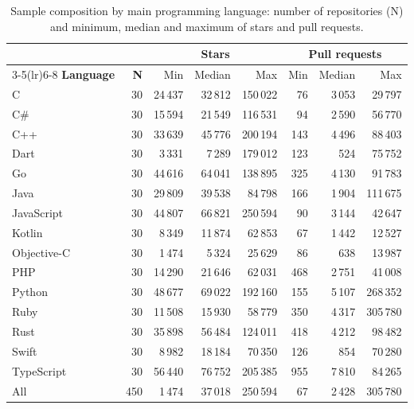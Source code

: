 \begin{table}[t]
\centering
\caption{Sample composition by main programming language: number of repositories (N) and minimum, median and maximum of stars and pull requests.}
\label{tab:sample-by-language}
\small
\begin{tabular}{lrrrrrrr}
\toprule
 & & \multicolumn{3}{c}{\textbf{Stars}} & \multicolumn{3}{c}{\textbf{Pull requests}} \\
\cmidrule(lr){3-5}\cmidrule(lr){6-8}
\textbf{Language} & \textbf{N} & Min & Median & Max & Min & Median & Max \\
\midrule
C & 30 & 24\,437 & 32\,812 & 150\,022 & 76 & 3\,053 & 29\,797 \\
C\# & 30 & 15\,594 & 21\,549 & 116\,531 & 94 & 2\,590 & 56\,770 \\
C++ & 30 & 33\,639 & 45\,776 & 200\,194 & 143 & 4\,496 & 88\,403 \\
Dart & 30 & 3\,331 & 7\,289 & 179\,012 & 123 & 524 & 75\,752 \\
Go & 30 & 44\,616 & 64\,041 & 138\,895 & 325 & 4\,130 & 91\,783 \\
Java & 30 & 29\,809 & 39\,538 & 84\,798 & 166 & 1\,904 & 111\,675 \\
JavaScript & 30 & 44\,807 & 66\,821 & 250\,594 & 90 & 3\,144 & 42\,647 \\
Kotlin & 30 & 8\,349 & 11\,874 & 62\,853 & 67 & 1\,442 & 12\,527 \\
Objective-C & 30 & 1\,474 & 5\,324 & 25\,629 & 86 & 638 & 13\,987 \\
PHP & 30 & 14\,290 & 21\,646 & 62\,031 & 468 & 2\,751 & 41\,008 \\
Python & 30 & 48\,677 & 69\,022 & 192\,160 & 155 & 5\,107 & 268\,352 \\
Ruby & 30 & 11\,508 & 15\,930 & 58\,779 & 350 & 4\,317 & 305\,780 \\
Rust & 30 & 35\,898 & 56\,484 & 124\,011 & 418 & 4\,212 & 98\,482 \\
Swift & 30 & 8\,982 & 18\,184 & 70\,350 & 126 & 854 & 70\,280 \\
TypeScript & 30 & 56\,440 & 76\,752 & 205\,385 & 955 & 7\,810 & 84\,265 \\
\midrule
All & 450 & 1\,474 & 37\,018 & 250\,594 & 67 & 2\,428 & 305\,780 \\
\bottomrule
\end{tabular}
\end{table}

